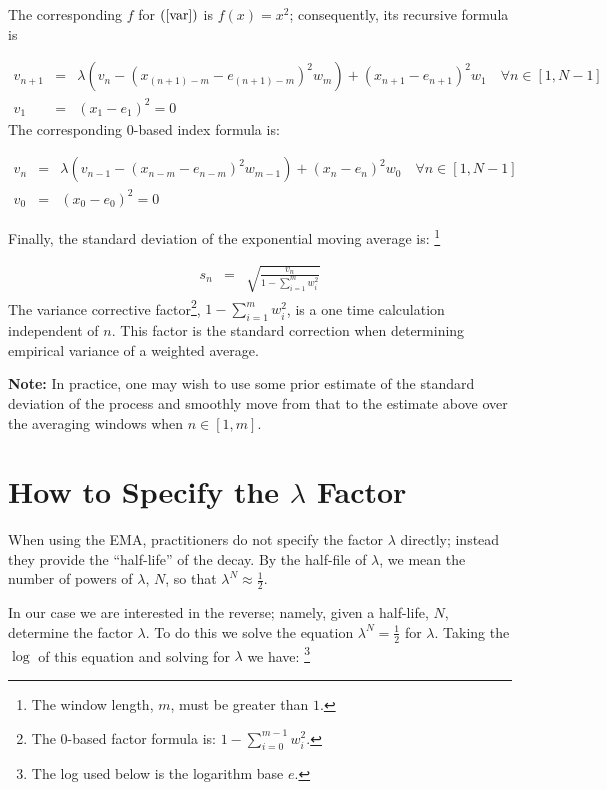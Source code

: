 \documentclass{article}
\begin{document}
The corresponding $f$ for $(\ref{var})$ is $f(x) = x^2$; 
consequently, its recursive formula is 

\begin{eqnarray}
    v_{n+1} &=& \lambda \left( v_n -  ( x_{(n+1)-m} - e_{(n+1)-m} )^2 w_m \right) + ( x_{n+1} - e_{n+1} )^2 w_1 \quad \forall n \in [1, N-1] \\
    v_1     &=&  (x_1 - e_1)^2 = 0 
\end{eqnarray}
The corresponding 0-based index formula is:

\begin{eqnarray}
    v_{n} &=& \lambda \left( v_{n-1} - ( x_{n-m} - e_{n-m} )^2 w_{m-1}\right) + ( x_{n} - e_{n} )^2 w_0 \quad \forall n \in [1, N-1] \\
    v_0   &=& (x_0 - e_0)^2 = 0 
\end{eqnarray}

Finally, the standard deviation of the exponential moving average is:%
\footnote{The window length, $m$, must be greater than $1$.}

\begin{eqnarray}
    s_{n} &=& \sqrt{\frac{v_n}{1 - \sum_{i=1}^m w_i^2}}  
\end{eqnarray}
The variance corrective factor\footnote{The 0-based factor formula is: $1 - \sum_{i=0}^{m-1} w_i^2$.}, $1 - \sum_{i=1}^m w_i^2$,
is a one time calculation independent of $n$. This factor is the standard 
correction when determining empirical variance of a weighted average.

{\bf Note:\/} In practice, one may wish to use some prior estimate of the standard deviation of the process
and smoothly move from that to the estimate above over the averaging windows when $n \in [1, m]$.


\section{How to Specify the $\lambda$ Factor}
When using the EMA, practitioners do not specify the factor $\lambda$ directly; 
instead they provide the ``half-life'' of the decay.
By the half-file of $\lambda$, we mean the number of powers of $\lambda$, $N$, so that
$\lambda^N \approx \frac{1}{2}$. 

In our case we are interested in the reverse; namely, given a half-life, $N$, 
determine the factor $\lambda$. To do this we solve the equation $\lambda^N = \frac{1}{2}$
for $\lambda$.
Taking the $\log$ of this equation and solving for $\lambda$ we have:%
\footnote{The log used below is the logarithm base $e$.}
\end{document}
